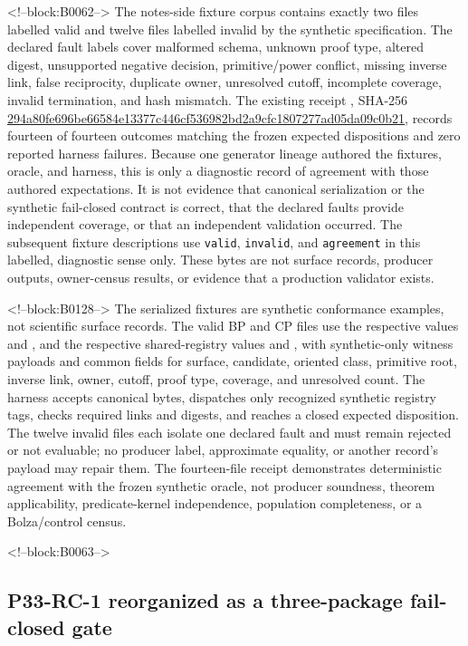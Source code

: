 \documentclass[11pt,a4paper]{article}
\begin{document}
<!--block:B0062-->
The notes-side fixture corpus contains exactly two files labelled valid and twelve files labelled invalid by the synthetic specification. The declared fault labels cover malformed schema, unknown proof type, altered digest, unsupported negative decision, primitive/power conflict, missing inverse link, false reciprocity, duplicate owner, unresolved cutoff, incomplete coverage, invalid termination, and hash mismatch. The existing receipt , SHA-256 \url{294a80fe696be66584e13377c446cf536982bd2a9cfc1807277ad05da09c0b21}, records fourteen of fourteen outcomes matching the frozen expected dispositions and zero reported harness failures. Because one generator lineage authored the fixtures, oracle, and harness, this is only a diagnostic record of agreement with those authored expectations. It is not evidence that canonical serialization or the synthetic fail-closed contract is correct, that the declared faults provide independent coverage, or that an independent validation occurred. The subsequent fixture descriptions use \texttt{valid}, \texttt{invalid}, and \texttt{agreement} in this labelled, diagnostic sense only. These bytes are not surface records, producer outputs, owner-census results, or evidence that a production validator exists.

<!--block:B0128-->
The serialized fixtures are synthetic conformance examples, not scientific surface records. The valid BP and CP files use the respective  values  and , and the respective shared-registry  values  and , with synthetic-only witness payloads and common fields for surface, candidate, oriented class, primitive root, inverse link, owner, cutoff, proof type, coverage, and unresolved count. The harness accepts canonical bytes, dispatches only recognized synthetic registry tags, checks required links and digests, and reaches a closed expected disposition. The twelve invalid files each isolate one declared fault and must remain rejected or not evaluable; no producer label, approximate equality, or another record's payload may repair them. The fourteen-file receipt demonstrates deterministic agreement with the frozen synthetic oracle, not producer soundness, theorem applicability, predicate-kernel independence, population completeness, or a Bolza/control census.

<!--block:B0063-->
\hypertarget{p33-rc-1-reorganized-as-a-three-package-fail-closed-gate}{%
\subsection{P33-RC-1 reorganized as a three-package fail-closed gate}\label{p33-rc-1-reorganized-as-a-three-package-fail-closed-gate}}
\end{document}

